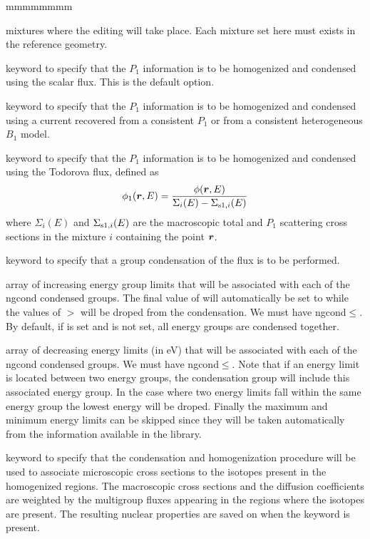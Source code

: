 \begin{ListeDeDescription}{mmmmmmmm}
\item[\dusa{imixt}] mixtures where the editing will take place.
Each mixture set here must exists in the reference geometry.

\item[\moc{P0W}] keyword to specify that the $P_1$ information is to be
homogenized and condensed using the scalar flux. This is the default option.

\item[\moc{P1W\_L}] keyword to specify that the $P_1$ information is to be
homogenized and condensed using a current recovered from a consistent $P_1$ or
from a consistent heterogeneous $B_1$ model.

\item[\moc{P1W\_T}] keyword to specify that the $P_1$ information is to be
homogenized and condensed using the Todorova flux\cite{todorova}, defined as
$$
\phi_1(\bff(r),E)={\phi(\bff(r),E)\over \Sigma_i(E)-\Sigma_{{\rm s1},i}(E)}
$$
\noindent where $\Sigma_i(E)$ and $\Sigma_{{\rm s1},i}(E)$ are the macroscopic total and $P_1$ scattering
cross sections in the mixture $i$ containing the point $\bff(r)$.

\item[\moc{COND}] keyword to specify that a group condensation of the flux is
to be performed.

\item[\dusa{icond}] array of increasing energy group limits that will be associated with
each of the ngcond condensed groups. The final value of
 will automatically be set to  while the values of 
$>$ will be droped from the condensation. 
We must have ngcond$\le$. By default, if  is set and 
is not set, all energy groups are condensed together.

\item[\dusa{energy}] array of decreasing energy limits (in eV) that will be
associated with each of the ngcond condensed groups. We must have ngcond$\le$. 
Note that if an energy limit is located between two energy groups, the condensation
group will include this associated energy group. In the case where two energy
limits fall within the same energy group the lowest energy will be droped.
Finally the maximum and minimum energy limits can be skipped since they will be
taken automatically from the information available in the library.

\item[\moc{MICR}] keyword to specify that the condensation and homogenization
procedure will be used to associate microscopic cross sections to the isotopes
present in the homogenized regions. The macroscopic cross sections and the
diffusion coefficients are weighted by the multigroup fluxes appearing in the
regions where the isotopes are present. The resulting nuclear properties are
saved on  when the  keyword is present.


\end{ListeDeDescription}
